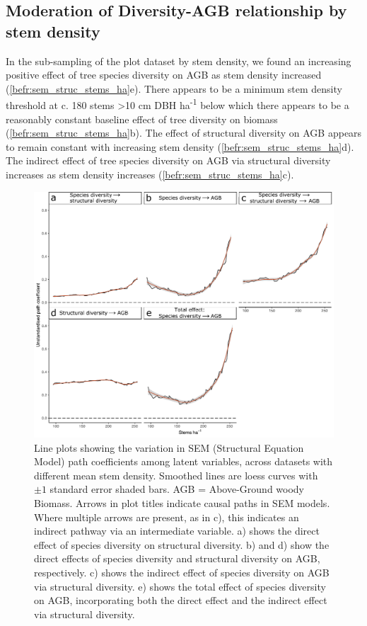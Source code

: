 \begin{refsection}
\subsection{Moderation of Diversity-AGB relationship by stem density}
\label{befr:ssec:stems}

In the sub-sampling of the plot dataset by stem density, we found an increasing positive effect of tree species diversity on AGB as stem density increased (\autoref{befr:sem_struc_stems_ha}e). There appears to be a minimum stem density threshold at c. 180 stems >10 cm DBH ha\textsuperscript{-1} below which there appears to be a reasonably constant baseline effect of tree diversity on biomass (\autoref{befr:sem_struc_stems_ha}b). The effect of structural diversity on AGB appears to remain constant with increasing stem density (\autoref{befr:sem_struc_stems_ha}d). The indirect effect of tree species diversity on AGB via structural diversity increases as stem density increases (\autoref{befr:sem_struc_stems_ha}c). 

\begin{figure}
	\includegraphics[width=0.8\linewidth]{img/sem_struc_stems_ha}
	\caption[Effect of stems density on path coefficients]{Line plots showing the variation in SEM (Structural Equation Model) path coefficients among latent variables, across datasets with different mean stem density. Smoothed lines are loess curves with $\pm1$ standard error shaded bars. AGB = Above-Ground woody Biomass. Arrows in plot titles indicate causal paths in SEM models. Where multiple arrows are present, as in c), this indicates an indirect pathway via an intermediate variable. a) shows the direct effect of species diversity on structural diversity. b) and d) show the direct effects of species diversity and structural diversity on AGB, respectively. c) shows the indirect effect of species diversity on AGB via structural diversity. e) shows the total effect of species diversity on AGB, incorporating both the direct effect and the indirect effect via structural diversity.}
	\label{befr:sem_struc_stems_ha}
\end{figure}


\end{refsection}
